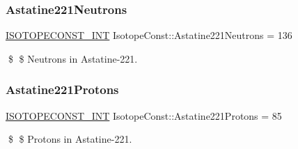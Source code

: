 \subsubsection{\texorpdfstring{Astatine221\+Neutrons}{Astatine221Neutrons}}
{\footnotesize\ttfamily \mbox{\hyperlink{group___isotope_const-_macros_ga5f18360b3e99483a35c32d789e62621c}{I\+S\+O\+T\+O\+P\+E\+C\+O\+N\+S\+T\+\_\+\+I\+NT}} Isotope\+Const\+::\+Astatine221\+Neutrons = 136}

\$ \$ Neutrons in Astatine-\/221. \mbox{\label{group___isotope_const-_astatine-_at221_ga450fa29d4166e5ee16b0bbb7c3615f7c}} 
\subsubsection{\texorpdfstring{Astatine221\+Protons}{Astatine221Protons}}
{\footnotesize\ttfamily \mbox{\hyperlink{group___isotope_const-_macros_ga5f18360b3e99483a35c32d789e62621c}{I\+S\+O\+T\+O\+P\+E\+C\+O\+N\+S\+T\+\_\+\+I\+NT}} Isotope\+Const\+::\+Astatine221\+Protons = 85}

\$ \$ Protons in Astatine-\/221. 